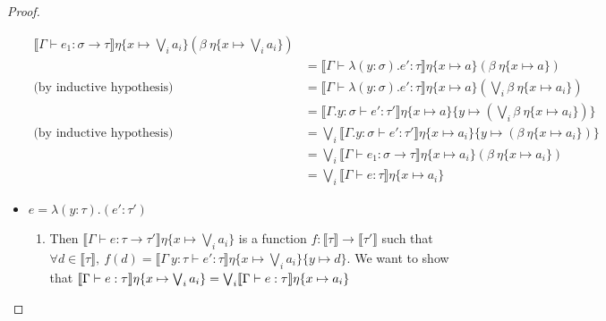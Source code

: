 \begin{proof}
\begin{itemize}
\begin{align*}
\llbracket \Gamma \vdash e_1 : \sigma \rightarrow \tau \rrbracket\eta\{x \mapsto \bigvee_i a_i\}
(\beta \ \eta\{x \mapsto \bigvee_i a_i\}) \\
&= \llbracket \Gamma \vdash \lambda (y:\sigma).e' : \tau \rrbracket\eta\{x \mapsto a\}
(\beta \ \eta\{x \mapsto a\}) \\
\text{(by inductive hypothesis)} &= 
\llbracket \Gamma \vdash \lambda (y:\sigma).e' : \tau \rrbracket\eta\{x \mapsto a\}
(\bigvee_i\beta\ \eta\{x \mapsto a_i\}) \\
&= \llbracket \Gamma. y : \sigma \vdash e' : \tau' \rrbracket\eta\{x \mapsto a\}\{y \mapsto (\bigvee_i\beta\ \eta\{x \mapsto a_i\})\} \\
\text{(by inductive hypothesis)}&= \bigvee_i \llbracket \Gamma. y : \sigma \vdash e' : \tau' \rrbracket\eta\{x \mapsto 
a_i\}\{y \mapsto (\beta \ \eta\{x \mapsto a_i\})\} \\
&=\bigvee_i \llbracket \Gamma \vdash e_1: \sigma \rightarrow \tau\rrbracket\eta\{x\mapsto a_i\}
(\beta \ \eta\{x\mapsto a_i\}) \\
&= \bigvee_i \llbracket \Gamma \vdash e:\tau\rrbracket\eta\{ x \mapsto a_i\} 
\end{align*}
 \item $e = \lambda (y : \tau) . (e' : \tau')$
 \begin{enumerate}
 \item Then $\llbracket \Gamma \vdash e : \tau \rightarrow \tau' \rrbracket\eta\{x\mapsto  \bigvee_i a_i\}$ 
 is a function $f: \llbracket \tau \rrbracket \rightarrow \llbracket \tau'  \rrbracket$ such that 
 $\forall d \in \llbracket \tau \rrbracket, \ f(d) = \llbracket \Gamma \ y : \tau \vdash e' : \tau 
 \rrbracket\eta\{x\mapsto  \bigvee_i a_i\}\{y \mapsto d\}$. We want to show that
 $\llbracket{{\Gamma}\vdash{e}:{\tau}}\rrbracket{\eta\{{x}\mapsto{\bigvee_i a_i}\}} =
\bigvee_i\llbracket{{\Gamma}\vdash{e}:{\tau}}\rrbracket{\eta\{{x}\mapsto{a_i}\}}$
 

\end{enumerate}
\end{itemize}
\end{proof}
